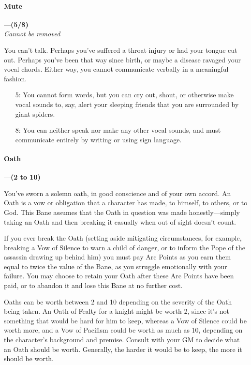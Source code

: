 \documentclass[oneside,11pt,english]{book}
\begin{document}
\paragraph{\label{bane:Mute}Mute}---\quad\textbf{(5/8) }\\
\emph{Cannot be removed}\par
You can't talk. Perhaps you've suffered a throat injury or had your tongue cut out. Perhaps you've been 
that way since birth, or maybe a disease ravaged your vocal chords. Either way, you cannot communicate verbally in a meaningful fashion.
\begin{itemize}
	\item [5:] You cannot form words, but you can cry out, shout, or otherwise make vocal sounds to, say, alert your sleeping friends that you are surrounded by giant spiders.
	\item [8:] You can neither speak nor make any other vocal sounds, and must communicate entirely by writing or using sign language.
\end{itemize}
\paragraph{\label{bane:Oath}Oath}---\quad\textbf{(2 to 10) }\par
You've sworn a solemn oath, in good conscience and of your own accord. An Oath is a vow or obligation 
that a character has made, to himself, to others, or to God. This Bane assumes that the Oath in question 
was made honestly—simply taking an Oath and then breaking it casually when out of sight doesn't count. 


If you ever break the Oath (setting aside mitigating circumstances, for example, breaking a Vow of 
Silence to warn a child of danger, or to inform the Pope of the assassin drawing up behind him) you must 
pay Arc Points as you earn them equal to twice the value of the Bane, as you struggle emotionally with 
your failure. You may choose to retain your Oath after these Arc Points have been paid, or to abandon it 
and lose this Bane at no further cost. 


Oaths can be worth between 2 and 10 depending on the severity of the Oath being taken. An Oath of 
Fealty for a knight might be worth 2, since it's not something that would be hard for him to keep, whereas 
a Vow of Silence could be worth more, and a Vow of Pacifism could be worth as much as 10, depending 
on the character's background and premise. Consult with your GM to decide what an Oath should be 
worth. Generally, the harder it would be to keep, the more it should be worth. 
\end{document}
